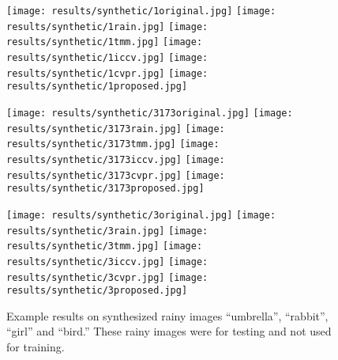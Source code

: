 \documentclass[journal]{IEEEtran}
\begin{document}
\begin{figure*}
\centering
\texttt{[image: results/synthetic/1original.jpg]}\vspace{1pt}
\texttt{[image: results/synthetic/1rain.jpg]}\vspace{1pt}
\texttt{[image: results/synthetic/1tmm.jpg]}\vspace{1pt}
\texttt{[image: results/synthetic/1iccv.jpg]}\vspace{1pt}
\texttt{[image: results/synthetic/1cvpr.jpg]}\vspace{1pt}
\texttt{[image: results/synthetic/1proposed.jpg]}\vspace{1pt}

\texttt{[image: results/synthetic/3173original.jpg]}\vspace{1pt}
\texttt{[image: results/synthetic/3173rain.jpg]}\vspace{1pt}
\texttt{[image: results/synthetic/3173tmm.jpg]}\vspace{1pt}
\texttt{[image: results/synthetic/3173iccv.jpg]}\vspace{1pt}
\texttt{[image: results/synthetic/3173cvpr.jpg]}\vspace{1pt}
\texttt{[image: results/synthetic/3173proposed.jpg]}\vspace{1pt}

\texttt{[image: results/synthetic/3original.jpg]}
\texttt{[image: results/synthetic/3rain.jpg]}
\texttt{[image: results/synthetic/3tmm.jpg]}
\texttt{[image: results/synthetic/3iccv.jpg]}
\texttt{[image: results/synthetic/3cvpr.jpg]}
\texttt{[image: results/synthetic/3proposed.jpg]}

\caption{Example results on synthesized rainy images ``umbrella'', ``rabbit'', ``girl'' and ``bird.'' These rainy images were for testing and not used for training.} \label{fig.synthetic1}
\end{figure*}
\end{document}

